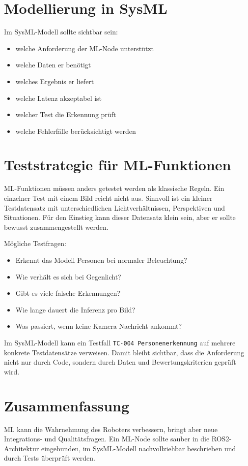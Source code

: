 \section{Modellierung in SysML}
Im SysML-Modell sollte sichtbar sein:

\begin{itemize}
    \item welche Anforderung der ML-Node unterstützt
    \item welche Daten er benötigt
    \item welches Ergebnis er liefert
    \item welche Latenz akzeptabel ist
    \item welcher Test die Erkennung prüft
    \item welche Fehlerfälle berücksichtigt werden
\end{itemize}

\section{Teststrategie für ML-Funktionen}
ML-Funktionen müssen anders getestet werden als klassische Regeln. Ein einzelner Test mit einem Bild reicht nicht aus. Sinnvoll ist ein kleiner Testdatensatz mit unterschiedlichen Lichtverhältnissen, Perspektiven und Situationen. Für den Einstieg kann dieser Datensatz klein sein, aber er sollte bewusst zusammengestellt werden.

Mögliche Testfragen:

\begin{itemize}
    \item Erkennt das Modell Personen bei normaler Beleuchtung?
    \item Wie verhält es sich bei Gegenlicht?
    \item Gibt es viele falsche Erkennungen?
    \item Wie lange dauert die Inferenz pro Bild?
    \item Was passiert, wenn keine Kamera-Nachricht ankommt?
\end{itemize}

Im SysML-Modell kann ein Testfall \texttt{TC-004 Personenerkennung} auf mehrere konkrete Testdatensätze verweisen. Damit bleibt sichtbar, dass die Anforderung nicht nur durch Code, sondern durch Daten und Bewertungskriterien geprüft wird.

\section{Zusammenfassung}
ML kann die Wahrnehmung des Roboters verbessern, bringt aber neue Integrations- und Qualitätsfragen. Ein ML-Node sollte sauber in die ROS2-Architektur eingebunden, im SysML-Modell nachvollziehbar beschrieben und durch Tests überprüft werden.

